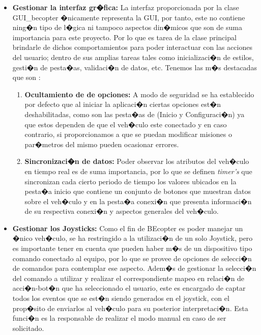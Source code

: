 \begin{itemize}
	
	\item \textbf{Gestionar la interfaz gr�fica: }  La interfaz proporcionada por la clase GUI\_becopter �nicamente representa la GUI, por tanto, este no contiene ning�n tipo de l�gica ni tampoco aspectos din�micos que son de suma importancia para este proyecto. Por lo que es tarea de la clase principal brindarle de dichos comportamientos para poder interactuar con las acciones del usuario; dentro de sus amplias tareas tales como inicializaci�n de estilos, gesti�n de pesta�as, validaci�n de datos, etc.  Tenemos las m�s destacadas que son :
	
	\begin{enumerate}
		
		\item \textbf{Ocultamiento de de opciones: } A modo de seguridad se ha establecido por defecto que al iniciar la aplicaci�n ciertas opciones est�n deshabilitadas, como son las pesta�as de (Inicio y Configuraci�n) ya que estos dependen de que el veh�culo este conectado y en caso contrario, si proporcionamos a que se puedan modificar misiones o par�metros del mismo pueden ocasionar errores.  
		
		
		\item \textbf{Sincronizaci�n de datos: } Poder observar los atributos del veh�culo en tiempo real es de suma importancia, por lo que se definen \textit{timer's} que sincronizan cada cierto periodo de tiempo los valores ubicados en la pesta�a inicio que contiene un conjunto de botones que muestran datos sobre el veh�culo y en la pesta�a conexi�n que presenta informaci�n de su respectiva conexi�n y aspectos generales del veh�culo.
		
	\end{enumerate}
	
	\item \textbf{Gestionar los Joysticks: } Como el fin de BEcopter es poder manejar un �nico veh�culo, se ha restringido a la utilizaci�n de un solo Joystick, pero es importante tener en cuenta que pueden haber m�s de un dispositivo tipo comando conectado al equipo, por lo que se provee de opciones de selecci�n de comandos para contemplar ese aspecto. 
	Adem�s de gestionar la selecci�n del comando a utilizar y realizar el correspondiente mapeo en relaci�n de acci�n-bot�n que ha seleccionado el usuario, este es encargado de captar todos los eventos que se est�n siendo generados en el joystick, con el prop�sito de enviarlos al veh�culo para su posterior interpretaci�n. Esta funci�n es la responsable de realizar el modo manual en caso de ser solicitado.
	

\end{itemize}
